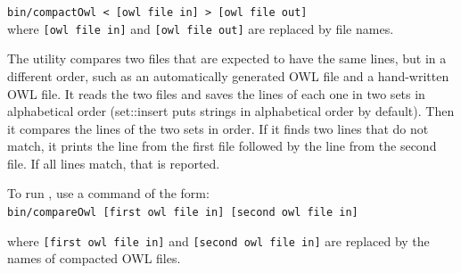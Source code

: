 \texttt{bin/compactOwl < [owl file in] > [owl file out]}\\

where \texttt{[owl file in]} and \texttt{[owl file out]} are replaced by file names.

The  utility compares two files that are expected to have the
same lines, but in a different order, such as an automatically generated
OWL file and a hand-written OWL file. It reads the two files and saves the
lines of each one in two sets in alphabetical order (set::insert puts
strings in alphabetical order by default). Then it compares the lines of
the two sets in order. If it finds two lines that do not match, it prints
the line from the first file followed by the line from the second file.  If
all lines match, that is reported.

To run , use a command of the form:\\

\texttt{bin/compareOwl [first owl file in] [second owl file in]}

where \texttt{[first owl file in]} and \texttt{[second owl file in]} are replaced by the
names of compacted OWL files.
